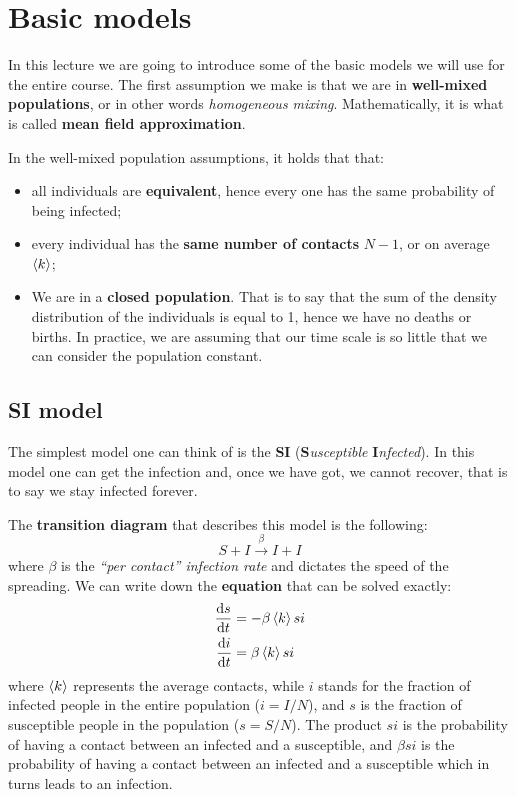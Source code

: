 \documentclass[../main/main.tex]{subfiles}
\begin{document}

\section{Basic models}

In this lecture we are going to introduce some of the basic models we will use for the entire course. The first assumption we make is that we are in \textbf{well-mixed populations}, or in other words \textit{homogeneous mixing}. Mathematically, it is what is called \textbf{mean field approximation}.

In the well-mixed population assumptions, it holds that that:
\begin{itemize}
\item all individuals are \textbf{equivalent}, hence every one has the same probability of being infected;
\item every individual has the \textbf{same number of contacts} $N-1$, or on average $\expval{k}$;
\item We are in a \textbf{closed population}. That is to say that the sum of the density distribution of the individuals is equal to 1, hence we have no deaths or births. In practice, we are assuming that our time scale is so little that we can consider the population constant.
\end{itemize}

\subsection{SI model}

The simplest model one can think of is the \textbf{SI} (\textbf{S}\textit{usceptible} \textbf{I}\textit{nfected}). In this model one can get the infection and, once we have got, we cannot recover, that is to say we stay infected forever.

The \textbf{transition diagram} that describes this model is the following:
\begin{equation}
  S + I \overset{\beta }{\rightarrow} I + I
\end{equation}
where $\beta$ is the \textit{“per contact” infection rate} and dictates the speed of the spreading. We can write down the \textbf{equation} that can be solved exactly:
\begin{equation}
\begin{split}
  \dv{s}{t} &= - \beta \expval{k} s i \\ \dv{i}{t} &= \beta \expval{k} s i
\end{split}
\end{equation}
where $\expval{k}$ represents the average contacts, while $i$ stands for the fraction of infected people in the entire population ($i=I/N$), and $s$ is the fraction of susceptible people in the population ($s=S/N$).
The product $s i$ is the probability of having a contact between an infected and a susceptible, and $\beta  s i$ is the probability of having a contact between an infected and a susceptible which in turns leads to an infection.
\end{document}
